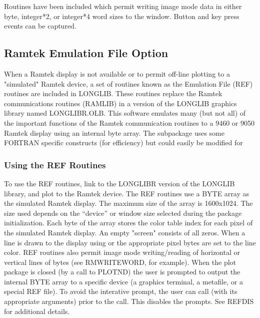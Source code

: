 \documentclass[11pt]{report}
\begin{document}
Routines have been included which permit writing image mode data in
either byte, integer*2, or integer*4 word sizes to the window.  Button
and key press events can be captured.


\subsection{Ramtek Emulation File Option}

When a Ramtek display is not available or to permit off-line plotting
to a "simulated" Ramtek device, a set of routines known as
the  Emulation File (REF) routines are included in LONGLIB.
These routines replace the Ramtek communications routines (RAMLIB) in
a version of the LONGLIB graphics library named LONGLIBR.OLB.  This
software emulates many (but not all) of the important functions of the
Ramtek communication routines to a 9460 or 9050 Ramtek display using
an internal byte array.  The  subpackage uses some 
FORTRAN specific constructs (for efficiency) but could easily be
modified for


\subsubsection{Using the REF Routines}

To use the REF routines, link to the LONGLIBR version of the LONGLIB
library, and plot to the Ramtek device.  The REF routines use a BYTE
array as the simulated Ramtek display.  The maximum size of the array
is 1600x1024.  The size used depends on the ``device'' or window size
selected during the package initialization.  Each byte of the array
stores the color table index for each pixel of the simulated Ramtek
display.  An empty "screen" consists of all zeros.  When a line is
drawn to the display using  or  the appropriate
pixel bytes are set to the line color.  REF routines also permit image
mode writing/reading of horizontal or vertical lines of bytes (see
RMWRITEWORD, for example).  When the plot package is closed (by a call
to PLOTND) the user is prompted to output the internal BYTE array
to a specific device (a graphics terminal, a metafile, or a special
REF file).  To avoid the interative prompt, the user can
call  (with its appropriate arguments) prior to
the  call.  This disables the prompts.  See REFDIS for
additional details.
\end{document}
